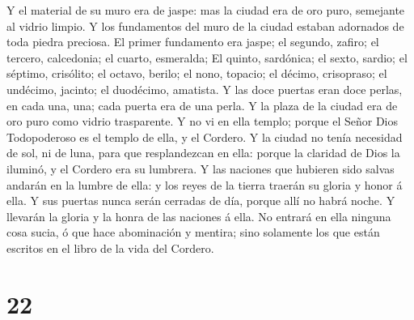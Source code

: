  Y el material de su muro era de jaspe: mas la ciudad era
de oro puro, semejante al vidrio limpio.  Y los fundamentos
del muro de la ciudad estaban adornados de toda piedra preciosa. El
primer fundamento era jaspe; el segundo, zafiro; el tercero, calcedonia;
el cuarto, esmeralda;  El quinto, sardónica; el sexto,
sardio; el séptimo, crisólito; el octavo, berilo; el nono, topacio; el
décimo, crisopraso; el undécimo, jacinto; el duodécimo, amatista.
 Y las doce puertas eran doce perlas, en cada una, una;
cada puerta era de una perla. Y la plaza de la ciudad era de oro puro
como vidrio trasparente.  Y no vi en ella templo; porque el
Señor Dios Todopoderoso es el templo de ella, y el Cordero.
 Y la ciudad no tenía necesidad de sol, ni de luna, para
que resplandezcan en ella: porque la claridad de Dios la iluminó, y el
Cordero era su lumbrera.  Y las naciones que hubieren sido
salvas andarán en la lumbre de ella: y los reyes de la tierra traerán su
gloria y honor á ella.  Y sus puertas nunca serán cerradas
de día, porque allí no habrá noche.  Y llevarán la gloria y
la honra de las naciones á ella.  No entrará en ella
ninguna cosa sucia, ó que hace abominación y mentira; sino solamente los
que están escritos en el libro de la vida del Cordero.

\hypertarget{section-21}{%
\section{22}\label{section-21}}

